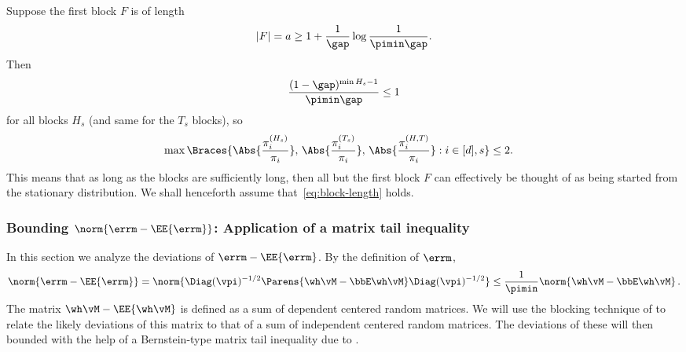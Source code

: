 Suppose the first block $F$ is of length
\begin{equation}
  \label{eq:block-length}
  |F| = a \geq 1 + \frac{1}{\gap} \log \frac1{\pimin\gap}
  .
\end{equation}
Then
\[
  \frac{(1-\gap)^{\min H_s - 1}}{\pimin\gap}
  \leq 1
\]
for all blocks $H_s$ (and same for the $T_s$ blocks), so
\begin{align}
  \max \Braces{
    \Abs{ \frac{\pi_i^{(H_s)}}{\pi_i} } ,\,
    \Abs{ \frac{\pi_i^{(T_s)}}{\pi_i} } ,\,
    \Abs{ \frac{\pi_i^{(H,T)}}{\pi_i} }
    : i \in [d] , s
  }
  & \leq 2
  .
  \label{eq:near-stationary}
\end{align}
This means that as long as the blocks are sufficiently long, then all
but the first block $F$ can effectively be thought of as being started
from the stationary distribution.
We shall henceforth assume that~\eqref{eq:block-length} holds.
\fi
\subsubsection{
Bounding $\norm{\errm-\EE{\errm}}$: 
Application of a matrix tail inequality}
\label{sec:pairwise-tailbound}

In this section we analyze the deviations of $\errm-\EE{\errm}$. By the definition of $\errm$,
\begin{align}
\label{eq:errmdev1}
\norm{\errm-\EE{\errm}}
 =  \norm{\Diag(\vpi)^{-1/2}\Parens{\wh\vM - \bbE \wh\vM } \Diag(\vpi)^{-1/2}}
 \le \frac{1}{\pimin} \norm{\wh\vM - \bbE \wh\vM }
 \,.
\end{align}
The matrix $\wh\vM - \EE{\wh\vM}$  is defined 
as a sum of dependent centered random matrices.
We will use the blocking technique of  \citet{Bernstein27} 
to relate the likely deviations of this matrix to that of
a sum of independent centered random matrices.
The deviations of these will then bounded
with the help of a Bernstein-type matrix tail inequality due to \citet{tropp2015intro}.


